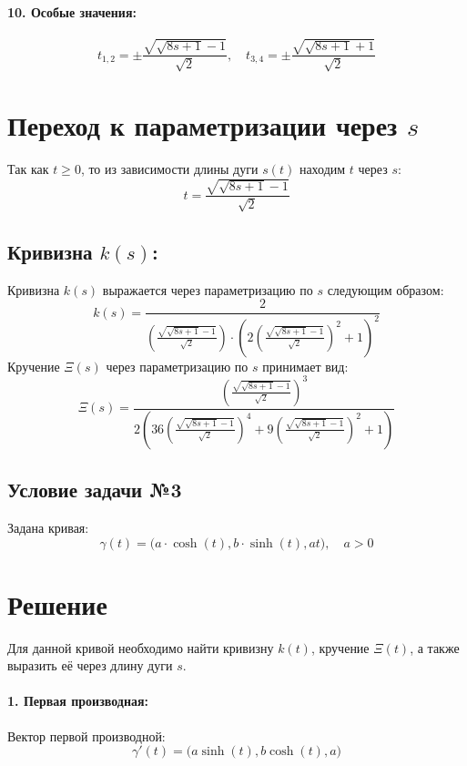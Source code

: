 \documentclass{article}
\begin{document}
        \paragraph{10. Особые значения:}
        \[
        t_{1,2} = \pm \frac{\sqrt{\sqrt{8s + 1} - 1}}{\sqrt{2}}, \quad t_{3,4} = \pm \frac{\sqrt{\sqrt{8s + 1} + 1}}{\sqrt{2}}
        \]
        \section*{Переход к параметризации через $s$}
        Так как \(t \geq 0\), то из зависимости длины дуги \(s(t)\) находим \(t\) через \(s\):
        \[
        t = \frac{\sqrt{\sqrt{8s + 1} - 1}}{\sqrt{2}}
        \]
        \subsection*{Кривизна \(k(s)\):}
        Кривизна \(k(s)\) выражается через параметризацию по \(s\) следующим образом:
        \[
        k(s) = \frac{2}{\left( \frac{\sqrt{\sqrt{8s + 1} - 1}}{\sqrt{2}} \right) \cdot \left( 2 \left( \frac{\sqrt{\sqrt{8s + 1} - 1}}{\sqrt{2}} \right)^2 + 1 \right)^2}
        \]
        Кручение \(\Xi(s)\) через параметризацию по \(s\) принимает вид:
        \[
        \Xi(s) = \frac{\left( \frac{\sqrt{\sqrt{8s + 1} - 1}}{\sqrt{2}} \right)^3}
        {2 \left( 36 \left( \frac{\sqrt{\sqrt{8s + 1} - 1}}{\sqrt{2}} \right)^4 + 9 \left( \frac{\sqrt{\sqrt{8s + 1} - 1}}{\sqrt{2}} \right)^2 + 1 \right)}
        \]

        \subsection*{Условие задачи №3}
        Задана кривая:
        \[
        \gamma(t) = \big(a \cdot \cosh(t), b \cdot \sinh(t), at\big), \quad a > 0
        \]
        \section*{Решение}
        Для данной кривой необходимо найти кривизну \(k(t)\), кручение \(\Xi(t)\), а также выразить её через длину дуги \(s\).
        
        \paragraph{1. Первая производная:}
        Вектор первой производной:
        \[
        \gamma'(t) = \big(a \sinh(t), b \cosh(t), a\big)
        \]     
\end{document}
